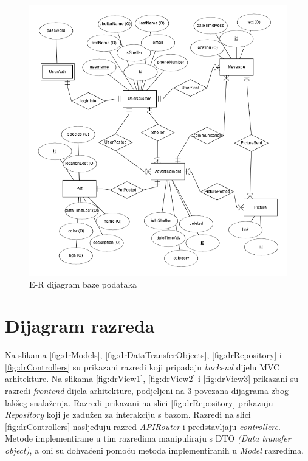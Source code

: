 				\begin{figure}[H]
					\includegraphics[scale=0.65]{dijagrami/dijagramBaze/ERmodel.PNG} %
					\centering
					\caption{E-R dijagram baze podataka}
					\label{fig:erDijagram}
				\end{figure}

			\eject
			
			
		\section{Dijagram razreda}
		
			Na slikama \ref{fig:drModels}, \ref{fig:drDataTransferObjects}, \ref{fig:drRepository} i \ref{fig:drControllers} su prikazani razredi koji pripadaju \textit{backend} dijelu MVC arhitekture. Na slikama \ref{fig:drView1}, \ref{fig:drView2} i \ref{fig:drView3} prikazani su razredi \textit{frontend} dijela arhitekture, podjeljeni na 3 povezana dijagrama zbog lakšeg snalaženja. Razredi prikazani na slici \ref{fig:drRepository} prikazuju \textit{Repository} koji je zadužen za interakciju s bazom. Razredi na slici \ref{fig:drControllers} nasljeđuju razred \textit{APIRouter} i predstavljaju \textit{controllere}. Metode implementirane u tim razredima manipuliraju s DTO \textit{(Data transfer object)}, a oni su dohvaćeni pomoću metoda implementiranih u \textit{Model} razredima.

